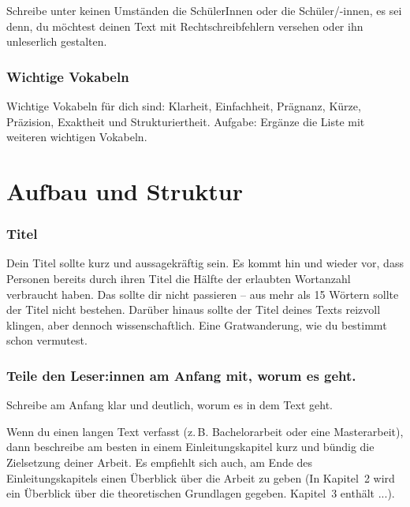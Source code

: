 \documentclass{../cssheet}
\begin{document}
Schreibe unter keinen Umständen \glqq{}die SchülerInnen\grqq{} oder \glqq{}die
Schüler/-innen\grqq{}, es sei denn, du möchtest deinen Text mit
Rechtschreibfehlern versehen oder ihn unleserlich gestalten. 

\subsubsection*{Wichtige Vokabeln}

Wichtige Vokabeln für dich sind: Klarheit, Einfachheit, Prägnanz, Kürze,
Präzision, Exaktheit und Strukturiertheit. Aufgabe: Ergänze die Liste
mit weiteren wichtigen Vokabeln.

\section{Aufbau und Struktur}

\subsubsection*{Titel}

Dein Titel sollte kurz und aussagekräftig sein. Es kommt hin und wieder
vor, dass Personen bereits durch ihren Titel die Hälfte der erlaubten
Wortanzahl verbraucht haben. Das sollte dir nicht passieren -- aus mehr
als 15 Wörtern sollte der Titel nicht bestehen. Darüber hinaus sollte
der Titel deines Texts reizvoll klingen, aber dennoch wissenschaftlich.
Eine Gratwanderung, wie du bestimmt schon vermutest.

\subsubsection*{Teile den Leser:innen am Anfang mit, worum es geht.}

Schreibe am Anfang klar und deutlich, worum es in dem Text geht.

Wenn du einen langen Text verfasst (z.\,B. Bachelorarbeit oder eine Masterarbeit), dann beschreibe am besten in einem Einleitungskapitel kurz
und bündig die Zielsetzung deiner Arbeit. Es empfiehlt sich auch, am
Ende des Einleitungskapitels einen Überblick über die Arbeit zu geben
(\glqq{}In Kapitel~2 wird ein Überblick über die theoretischen Grundlagen
gegeben. Kapitel~3 enthält ...\grqq{}).
\end{document}
